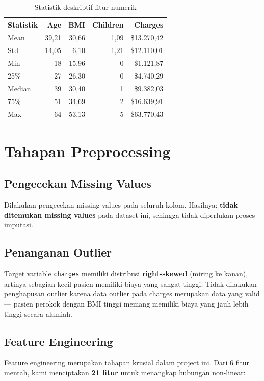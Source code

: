 \documentclass[12pt,a4paper]{article}
\begin{document}
\begin{table}[h!]
\centering
\caption{Statistik deskriptif fitur numerik}
\begin{tabular}{lrrrr}
\toprule
\textbf{Statistik} & \textbf{Age} & \textbf{BMI} & \textbf{Children} & \textbf{Charges} \\
\midrule
Mean    & 39,21  & 30,66 & 1,09 & \$13.270,42 \\
Std     & 14,05  & 6,10  & 1,21 & \$12.110,01 \\
Min     & 18     & 15,96 & 0    & \$1.121,87  \\
25\%    & 27     & 26,30 & 0    & \$4.740,29  \\
Median  & 39     & 30,40 & 1    & \$9.382,03  \\
75\%    & 51     & 34,69 & 2    & \$16.639,91 \\
Max     & 64     & 53,13 & 5    & \$63.770,43 \\
\bottomrule
\end{tabular}
\end{table}


\section{Tahapan Preprocessing}

\subsection{Pengecekan Missing Values}
Dilakukan pengecekan missing values pada seluruh kolom.  Hasilnya: \textbf{tidak ditemukan missing values} pada dataset ini, sehingga tidak diperlukan proses imputasi.

\subsection{Penanganan Outlier}
Target variable \texttt{charges} memiliki distribusi \textbf{right-skewed} (miring ke kanan), artinya sebagian kecil pasien memiliki biaya yang sangat tinggi.  Tidak dilakukan penghapusan outlier karena data outlier pada charges merupakan data yang valid — pasien perokok dengan BMI tinggi memang memiliki biaya yang jauh lebih tinggi secara alamiah.

\subsection{Feature Engineering}
Feature engineering merupakan tahapan krusial dalam project ini.  Dari 6 fitur mentah, kami menciptakan \textbf{21 fitur} untuk menangkap hubungan non-linear:
\end{document}
